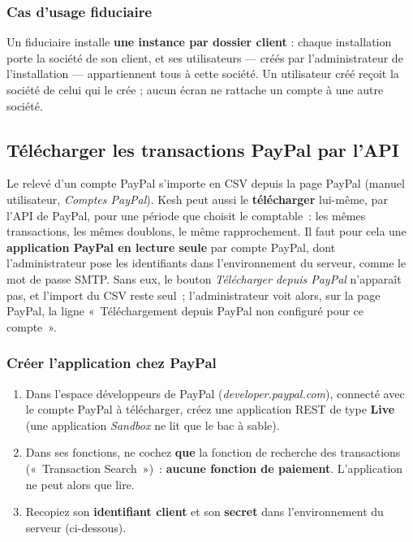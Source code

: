 \documentclass[a4paper,11pt,oneside]{article}
\begin{document}
\subsubsection{Cas d'usage fiduciaire}

Un fiduciaire installe \textbf{une instance par dossier client} : chaque installation porte la société de son client, et ses utilisateurs --- créés par l'administrateur de l'installation --- appartiennent tous à cette société. Un utilisateur créé reçoit la société de celui qui le crée ; aucun écran ne rattache un compte à une autre société.

\subsection{Télécharger les transactions PayPal par l'API}\label{sec:paypal-api}

Le relevé d'un compte PayPal s'importe en CSV depuis la page PayPal (manuel utilisateur, \emph{Comptes PayPal}). Kesh peut aussi le \textbf{télécharger} lui-même, par l'API de PayPal, pour une période que choisit le comptable~: les mêmes transactions, les mêmes doublons, le même rapprochement. Il faut pour cela une \textbf{application PayPal en lecture seule} par compte PayPal, dont l'administrateur pose les identifiants dans l'environnement du serveur, comme le mot de passe SMTP. Sans eux, le bouton \emph{Télécharger depuis PayPal} n'apparaît pas, et l'import du CSV reste seul~; l'administrateur voit alors, sur la page PayPal, la ligne «~Téléchargement depuis PayPal non configuré pour ce compte~».

\subsubsection{Créer l'application chez PayPal}

\begin{enumerate}
    \item Dans l'espace développeurs de PayPal (\emph{developer.paypal.com}), connecté avec le compte PayPal à télécharger, créez une application REST de type \textbf{Live} (une application \emph{Sandbox} ne lit que le bac à sable).
    \item Dans ses fonctions, ne cochez \textbf{que} la fonction de recherche des transactions («~Transaction Search~»)~: \textbf{aucune fonction de paiement}. L'application ne peut alors que lire.
    \item Recopiez son \textbf{identifiant client} et son \textbf{secret} dans l'environnement du serveur (ci-dessous).
\end{enumerate}
\end{document}

